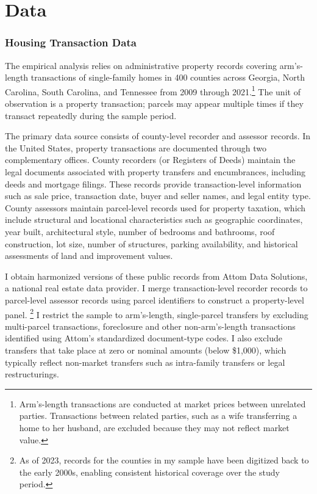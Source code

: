 \documentclass[11pt]{article}
\begin{document}
\section{Data}


\subsubsection{Housing Transaction Data}\label{sec:data:summarystats}
The empirical analysis relies on administrative property records covering arm’s-length transactions of single-family homes in 400 counties across Georgia, North Carolina, South Carolina, and Tennessee from 2009 through 2021.\footnote{Arm’s-length transactions are conducted at market prices between unrelated parties. Transactions between related parties, such as a wife transferring a home to her husband, are excluded because they may not reflect market value.} The unit of observation is a property transaction; parcels may appear multiple times if they transact repeatedly during the sample period.

The primary data source consists of county-level recorder and assessor records. In the United States, property transactions are documented through two complementary offices. County recorders (or Registers of Deeds) maintain the legal documents associated with property transfers and encumbrances, including deeds and mortgage filings. These records provide transaction-level information such as sale price, transaction date, buyer and seller names, and legal entity type. County assessors maintain parcel-level records used for property taxation, which include structural and locational characteristics such as geographic coordinates, year built, architectural style, number of bedrooms and bathrooms, roof construction, lot size, number of structures, parking availability, and historical assessments of land and improvement values.

I obtain harmonized versions of these public records from Attom Data Solutions, a national real estate data provider. I merge transaction-level recorder records to parcel-level assessor records using parcel identifiers to construct a property-level panel. \footnote{As of 2023, records for the counties in my sample have been digitized back to the early 2000s, enabling consistent historical coverage over the study period.} I restrict the sample to arm’s-length, single-parcel transfers by excluding multi-parcel transactions, foreclosure and other non-arm’s-length transactions identified using Attom’s standardized document-type codes. I also exclude transfers that take place at zero or nominal amounts (below \$1,000), which typically reflect non-market transfers such as intra-family transfers or legal restructurings. 
\end{document}
